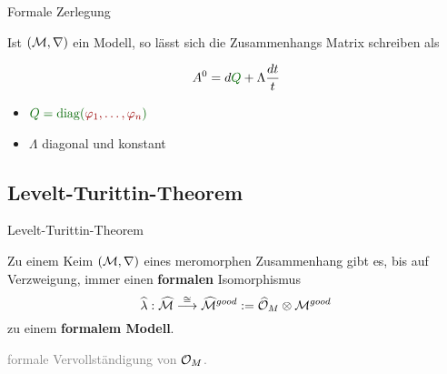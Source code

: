 \begin{frame}[t]{Formale Zerlegung}
  \begin{lem}
    Ist $(\mathcal{M},\nabla)$ ein Modell, so lässt sich die Zusammenhangs Matrix
    schreiben als
    \begin{multicols}{2}
      \[
        A^0=d\overset{~\tikzmark{e1}}{\textcolor{green!40!black}{Q}}
           +~\tikzmark{e2}\!\!\Lambda\frac{dt}{t}
      \]
      \columnbreak
      \begin{itemize}
        \item[\tikzmarkb{n1}{green}]
          $\textcolor{green!40!black}{Q
            =\diag(\textcolor{red!60!black}{\phi_1,\dots,\phi_n})}$
        \item[\tikzmarkc{n2}{blue}]
          $\Lambda$ diagonal und konstant
      \end{itemize}
    \end{multicols}
  \end{lem}
  \vfill
  \vfill
\end{frame}
\subsection{Levelt-Turittin-Theorem}
\begin{frame}{Levelt-Turittin-Theorem}
  \begin{tthm}
    Zu einem Keim $(\mathcal{M},\nabla)$ eines meromorphen Zusammenhang gibt es, bis
    auf Verzweigung, immer einen \textbf{formalen} Isomorphismus
    \[
      \hat\lambda:\hat\cM
      \overset{\cong}\longrightarrow
      \hat\cM^{good}
      :=~\tikzmark{e1}\!\!\hat\cO_M\otimes\cM^{good}
    \]
    zu einem \textbf{formalem Modell}.
  \end{tthm}
  \begin{flushright}
    \textcolor{gray}{formale Vervollständigung von $\mathcal{O}_M$.}
  \end{flushright}
\end{frame}


